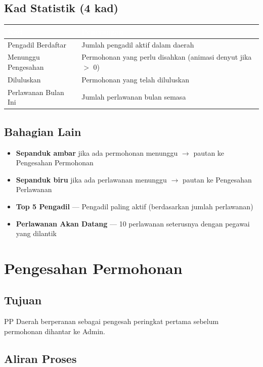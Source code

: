 \documentclass[12pt,a4paper]{report}
\begin{document}
\subsection{Kad Statistik (4 kad)}
\begin{table}[H]
\centering
{}
\begin{tabularx}{\textwidth}{l X}
\toprule
\rowcolor{tableheader}
\textcolor{white}{\textbf{Kad}} & \textcolor{white}{\textbf{Penerangan}} \\
\midrule
Pengadil Berdaftar & Jumlah pengadil aktif dalam daerah \\
Menunggu Pengesahan & Permohonan yang perlu disahkan (animasi denyut jika $>$ 0) \\
Diluluskan & Permohonan yang telah diluluskan \\
Perlawanan Bulan Ini & Jumlah perlawanan bulan semasa \\
\bottomrule
\end{tabularx}
\end{table}

\subsection{Bahagian Lain}
\begin{itemize}[label=\textcolor{pbnpblue}{\faChevronRight}]
  \item \textbf{Sepanduk ambar} jika ada permohonan menunggu $\rightarrow$ pautan ke Pengesahan Permohonan
  \item \textbf{Sepanduk biru} jika ada perlawanan menunggu $\rightarrow$ pautan ke Pengesahan Perlawanan
  \item \textbf{Top 5 Pengadil} --- Pengadil paling aktif (berdasarkan jumlah perlawanan)
  \item \textbf{Perlawanan Akan Datang} --- 10 perlawanan seterusnya dengan pegawai yang dilantik
\end{itemize}

\section{Pengesahan Permohonan}

\subsection{Tujuan}
PP Daerah berperanan sebagai pengesah peringkat pertama sebelum permohonan dihantar ke Admin.

\subsection{Aliran Proses}
\end{document}
